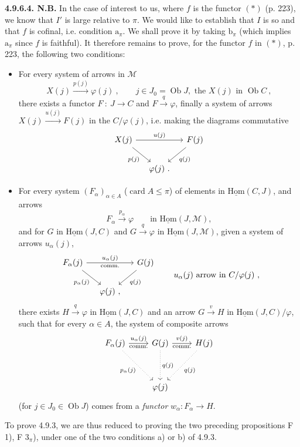 \documentclass[11pt]{article}
\newcommand{\printedpage}[1]{\marginpar{\footnotesize p.~#1}}
\newcommand{\msp}[1]{\marginpar{\footnotesize [#1]}}
\newcommand{\uHom}{\underline{\mathrm{Hom}}}
\newcommand{\Ob}{\operatorname{Ob}}
\newcommand{\card}{\operatorname{card}}
\newcommand{\cM}{\mathcal{M}}
\begin{document}
\textbf{4.9.6.4. N.B.} In the case of interest to us, where $f$ is the functor $(*)$ (p. 223), we know that $I'$ is large relative to $\pi$. We would like to establish that $I$ is so and that $f$ is cofinal, i.e. condition $\mathrm{a}_\pi$. We shall prove it by taking $\mathrm{b}_\pi$ (which implies $\mathrm{a}_\pi$ since $f$ is faithful). It therefore remains to
\msp{page 226}
prove, for the functor $f$ in $(*)$, p. 223, the following two conditions:
\begin{itemize}[label={}]
\item[F 1)] For every system of arrows in $\cM$
\[
X(j) \xrightarrow{p(j)} \varphi(j) \ , \qquad j \in J_0 = \Ob J, \text{ the } X(j) \text{ in } \Ob C \ ,
\]
there exists a functor $F \ : \ J \longrightarrow C$ and $F \xrightarrow{q} \varphi$, finally a system of arrows $X(j) \xrightarrow{u(j)} F(j)$ in the $C/\varphi(j)$, i.e. making the diagrams commutative %
\[
\begin{tikzcd}[column sep=small]
X(j) \arrow[rr, "u(j)"] \arrow[dr, "p(j)"'] & & F(j) \arrow[dl, "q(j)"] \\
& \varphi(j)\ . &
\end{tikzcd}
\]
\item[F $3_\pi$)] For every system $(F_\alpha)_{\alpha \in A}$ ($\card A \leqslant \pi$) of elements in $\uHom(C,J)$, and arrows %
\[
F_\alpha \xrightarrow{p_\alpha} \varphi \qquad \text{in } \uHom(J,\cM),
\]
and for $G$ in $\uHom(J,C)$ and $G \xrightarrow{q} \varphi$ in $\uHom(J,\cM)$, given a system of arrows $u_\alpha(j)$,
\printedpage{83}
\[
\begin{tikzcd}[column sep=small]
F_\alpha(j) \arrow[rr, "u_\alpha(j)", "\text{comm.}"'] \arrow[dr, "p_\alpha(j)"'] & & G(j) \arrow[dl, "q(j)"] \\
& \varphi(j)\ , &
\end{tikzcd}
\qquad u_\alpha(j) \text{ arrow in } C/\varphi(j) \ ,
\]
there exists $H \xrightarrow{q} \varphi$ in $\uHom(J,C)$ and an arrow $G \xrightarrow{v} H$ in $\uHom(J,C)/\varphi$, such that for every $\alpha \in A$, the system of composite arrows
\msp{page 227}
\[
\begin{tikzcd}[row sep=huge]
F_\alpha(j) \arrow[r, "u_\alpha(j)", "\text{comm.}"'] \arrow[dr, dotted, "p_\alpha(j)"'] & G(j) \arrow[r, "v(j)", "\text{comm.}"'] \arrow[d, dotted, "q(j)"] & H(j) \arrow[dl, dotted, "q(j)"] \\
& \varphi(j) &
\end{tikzcd}
\]
(for $j \in J_0 \in \Ob J$) comes from a \textit{functor} $w_\alpha : F_\alpha \longrightarrow H$. %
\end{itemize}
To prove 4.9.3, we are thus reduced to proving the two preceding propositions F 1), F $3_\pi$), under one of the two conditions a) or b) of 4.9.3.
\end{document}
